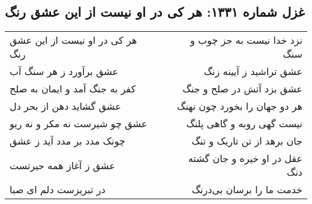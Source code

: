 \begin{center}
\section*{غزل شماره ۱۳۳۱: هر کی در او نیست از این عشق رنگ}
\label{sec:1331}
\begin{longtable}{l p{0.5cm} r}
هر کی در او نیست از این عشق رنگ
&&
نزد خدا نیست به جز چوب و سنگ
\\
عشق برآورد ز هر سنگ آب
&&
عشق تراشید ز آیینه زنگ
\\
کفر به جنگ آمد و ایمان به صلح
&&
عشق بزد آتش در صلح و جنگ
\\
عشق گشاید دهن از بحر دل
&&
هر دو جهان را بخورد چون نهنگ
\\
عشق چو شیرست نه مکر و نه ریو
&&
نیست گهی روبه و گاهی پلنگ
\\
چونک مدد بر مدد آید ز عشق
&&
جان برهد از تن تاریک و تنگ
\\
عشق ز آغاز همه حیرتست
&&
عقل در او خیره و جان گشته دنگ
\\
در تبریزست دلم ای صبا
&&
خدمت ما را برسان بی‌درنگ
\\
\end{longtable}
\end{center}

